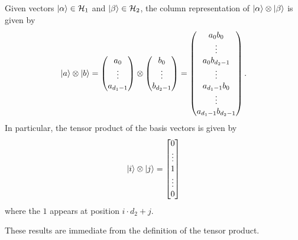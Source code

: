 \begin{fact}
    Given vectors $\ket{\alpha} \in \mathcal{H}_1$ and $\ket{\beta} \in \mathcal{H}_2$, the column representation of $\ket{\alpha}\otimes \ket{\beta}$ is given by
    \begin{align*}
        \ket{a} \otimes \ket{b} = \begin{pmatrix} a_0 \\ \vdots \\ a_{d_1-1} \end{pmatrix} \otimes \begin{pmatrix} b_0 \\ \vdots \\ b_{d_2-1} \end{pmatrix} = \begin{pmatrix} a_0 b_0 \\ \vdots \\ a_0 b_{d_2-1} \\ \vdots \\ a_{d_1-1} b_{0} \\ \vdots \\ a_{d_1-1} b_{d_2-1} \end{pmatrix}.
    \end{align*}
    In particular, the tensor product of the basis vectors is given by
    \[
    \ket{i} \otimes \ket{j} =
    \begin{bmatrix}0 \\ \vdots \\ 1 \\ \vdots \\ 0 \end{bmatrix}
    \]
    where the $1$ appears at position $i \cdot d_2 + j$.
\end{fact}
These results are immediate from the definition of the tensor product.

